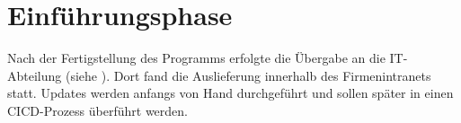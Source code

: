 \section{Einführungsphase}
\label{sec:Einfuehrungsphase}
Nach der Fertigstellung des Programms erfolgte die Übergabe an die IT-Abteilung
(siehe ).
Dort fand die Auslieferung innerhalb des Firmenintranets statt.
Updates werden anfangs von Hand durchgeführt und sollen später in einen
\ac{CICD}-Prozess überführt werden.
